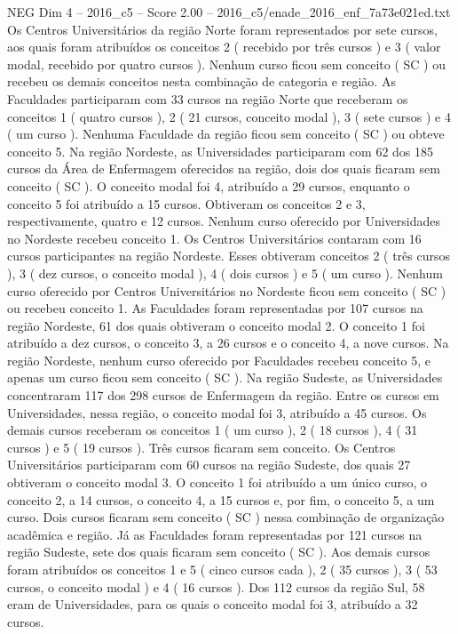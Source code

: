 \begin{textsample}{NEG Dim 4 – 2016\_c5 – Score 2.00 – 2016\_c5/enade\_2016\_enf\_7a73e021ed.txt}
Os Centros Universitários da região Norte foram representados por sete cursos, aos quais foram atribuídos os conceitos 2 ( recebido por três cursos ) e 3 ( valor modal, recebido por quatro cursos ).
Nenhum curso ficou sem conceito ( SC ) ou recebeu os demais conceitos nesta combinação de categoria e região.
As Faculdades participaram com 33 cursos na região Norte que receberam os conceitos 1 ( quatro cursos ), 2 ( 21 cursos, conceito modal ), 3 ( sete cursos ) e 4 ( um curso ).
Nenhuma Faculdade da região ficou sem conceito ( SC ) ou obteve conceito 5.
Na região Nordeste, as Universidades participaram com 62 dos 185 cursos da Área de Enfermagem oferecidos na região, dois dos quais ficaram sem conceito ( SC ).
O conceito modal foi 4, atribuído a 29 cursos, enquanto o conceito 5 foi atribuído a 15 cursos.
Obtiveram os conceitos 2 e 3, respectivamente, quatro e 12 cursos.
Nenhum curso oferecido por Universidades no Nordeste recebeu conceito 1.
Os Centros Universitários contaram com 16 cursos participantes na região Nordeste.
Esses obtiveram conceitos 2 ( três cursos ), 3 ( dez cursos, o conceito modal ), 4 ( dois cursos ) e 5 ( um curso ).
Nenhum curso oferecido por Centros Universitários no Nordeste ficou sem conceito ( SC ) ou recebeu conceito 1.
As Faculdades foram representadas por 107 cursos na região Nordeste, 61 dos quais obtiveram o conceito modal 2.
O conceito 1 foi atribuído a dez cursos, o conceito 3, a 26 cursos e o conceito 4, a nove cursos.
Na região Nordeste, nenhum curso oferecido por Faculdades recebeu conceito 5, e apenas um curso ficou sem conceito ( SC ).
Na região Sudeste, as Universidades concentraram 117 dos 298 cursos de Enfermagem da região.
Entre os cursos em Universidades, nessa região, o conceito modal foi 3, atribuído a 45 cursos.
Os demais cursos receberam os conceitos 1 ( um curso ), 2 ( 18 cursos ), 4 ( 31 cursos ) e 5 ( 19 cursos ).
Três cursos ficaram sem conceito.
Os Centros Universitários participaram com 60 cursos na região Sudeste, dos quais 27 obtiveram o conceito modal 3.
O conceito 1 foi atribuído a um único curso, o conceito 2, a 14 cursos, o conceito 4, a 15 cursos e, por fim, o conceito 5, a um curso.
Dois cursos ficaram sem conceito ( SC ) nessa combinação de organização acadêmica e região.
Já as Faculdades foram representadas por 121 cursos na região Sudeste, sete dos quais ficaram sem conceito ( SC ).
Aos demais cursos foram atribuídos os conceitos 1 e 5 ( cinco cursos cada ), 2 ( 35 cursos ), 3 ( 53 cursos, o conceito modal ) e 4 ( 16 cursos ).
Dos 112 cursos da região Sul, 58 eram de Universidades, para os quais o conceito modal foi 3, atribuído a 32 cursos.

\end{textsample}
